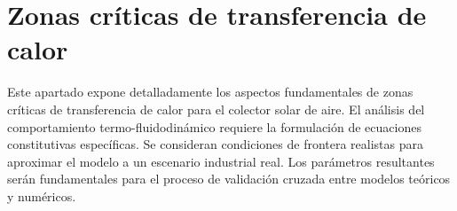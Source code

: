 \section{Zonas críticas de transferencia de calor}
\label{sec:cap09_criticas}

Este apartado expone detalladamente los aspectos fundamentales de zonas críticas de transferencia de calor para el colector solar de aire.
El análisis del comportamiento termo-fluidodinámico requiere la formulación de ecuaciones constitutivas específicas.
Se consideran condiciones de frontera realistas para aproximar el modelo a un escenario industrial real.
Los parámetros resultantes serán fundamentales para el proceso de validación cruzada entre modelos teóricos y numéricos.
